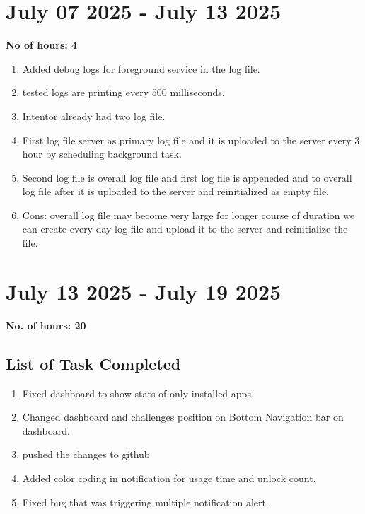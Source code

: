 \documentclass[12pt]{article}
\begin{document}
    \section{July 07 2025 - July 13 2025}
    {\bf No of hours: 4}
    \begin{enumerate}
        \item Added debug logs for foreground service in the log file.
        \item tested logs are printing every 500 milliseconds.
        \item Intentor already had two log file.
        \item First log file server as primary log file and it is uploaded to the server every 3 hour by scheduling background task.
        \item Second log file is overall log file and first log file is appeneded and to overall log file after it is uploaded to the server and reinitialized as empty file.
        \item Cons: overall log file may become very large for longer course of duration we can create every day log file and upload it to the server and reinitialize the file.
    \end{enumerate}
    \section{July 13 2025 - July 19 2025}
    {\bf No. of hours: 20}
    \subsection{List of Task Completed}
    \begin{enumerate}
        \item Fixed dashboard to show stats of only installed apps.
        \item Changed dashboard and challenges position on Bottom Navigation bar on dashboard.
        \item pushed the changes to github
        \item Added color coding in notification for usage time and unlock count.
        \item Fixed bug that was triggering multiple notification alert. 
    
    \end{enumerate}
\end{document}
